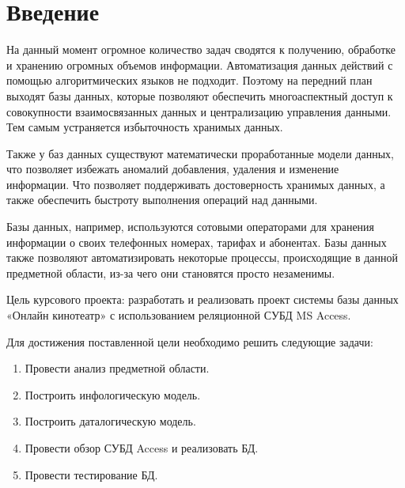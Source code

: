 \section*{Введение}\label{sec:introduction}


На данный момент огромное количество задач сводятся к получению, обработке и хранению огромных объемов информации. Автоматизация данных действий с помощью алгоритмических языков не подходит. Поэтому на передний план выходят базы данных, которые позволяют обеспечить многоаспектный доступ к совокупности взаимосвязанных данных и централизацию управления данными. Тем самым устраняется избыточность хранимых данных.

Также у баз данных существуют математически проработанные модели данных, что позволяет избежать аномалий добавления, удаления и изменение информации. Что позволяет поддерживать достоверность хранимых данных, а также обеспечить быстроту выполнения операций над данными.

Базы данных, например, используются сотовыми операторами для хранения информации о своих телефонных номерах, тарифах и абонентах. Базы данных также позволяют автоматизировать некоторые процессы, происходящие в данной предметной области, из-за чего они становятся просто незаменимы.

Цель курсового проекта: разработать и реализовать проект системы базы данных «Онлайн кинотеатр» с использованием реляционной СУБД MS Access.

Для достижения поставленной цели необходимо решить следующие задачи:
\begin{enumerate}
    \item Провести анализ предметной области.
    \item Построить инфологическую модель.
    \item Построить даталогическую модель.
    \item Провести обзор СУБД Access и реализовать БД.
    \item Провести тестирование БД.
\end{enumerate}


\newpage